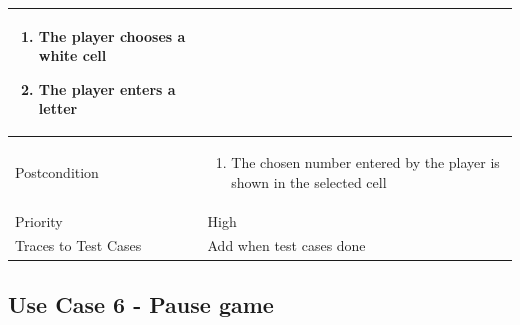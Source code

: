 \documentclass[12pt]{article}
\begin{document}
\begin{center}
\begin{tabular}{ |p{3.4cm}|p{10cm}| }
    \begin{enumerate}[leftmargin=0.2in]
        \item The player chooses a white cell 
        \item The player enters a letter
    \end{enumerate}  \\
    \hline
   Postcondition & 
    \vspace*{-0.1in}
    \begin{enumerate}[leftmargin=0.2in]
        \item The chosen number entered by the player is shown in the selected cell 
    \end{enumerate} \\
    \hline
    Priority & High  \\
    \hline
    Traces to Test Cases & Add when test cases done  \\
    \hline
\end{tabular}
\end{center}

\newpage


\subsection{Use Case 6 - Pause game}
\end{document}
